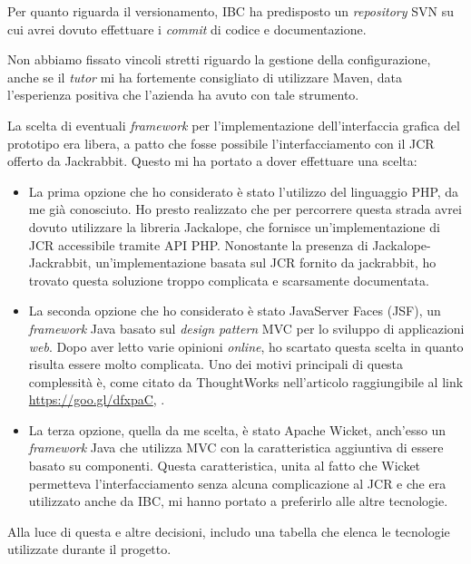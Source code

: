 		
		Per quanto riguarda il versionamento, IBC ha predisposto un \textit{repository} SVN su cui avrei dovuto effettuare i \textit{commit} di codice e documentazione.
		
		
		Non abbiamo fissato vincoli stretti riguardo la gestione della configurazione, anche se il \textit{tutor} mi ha fortemente consigliato di utilizzare Maven, data l'esperienza positiva che l'azienda ha avuto con tale strumento.
		
		
		La scelta di eventuali \textit{framework} per l'implementazione dell'interfaccia grafica del prototipo era libera, a patto che fosse possibile l'interfacciamento con il JCR offerto da Jackrabbit. Questo mi ha portato a dover effettuare una scelta:
		\begin{itemize}
			\item La prima opzione che ho considerato è stato l'utilizzo del linguaggio PHP, da me già conosciuto. Ho presto realizzato che per percorrere questa strada avrei dovuto utilizzare la libreria Jackalope, che fornisce un'implementazione di JCR accessibile tramite API PHP. Nonostante la presenza di Jackalope-Jackrabbit, un'implementazione basata sul JCR fornito da \gls{jackrabbit}, ho trovato questa soluzione troppo complicata e scarsamente documentata.
			\item La seconda opzione che ho considerato è stato JavaServer Faces (JSF), un \textit{framework} Java basato sul \textit{design pattern} MVC per lo sviluppo di applicazioni \textit{web}. Dopo aver letto varie opinioni \textit{online}, ho scartato questa scelta in quanto risulta essere molto complicata. Uno dei motivi principali di questa complessità è, come citato da ThoughtWorks nell'articolo raggiungibile al link \url{https://goo.gl/dfxpaC}, .
			\item La terza opzione, quella da me scelta, è stato Apache Wicket, anch'esso un \textit{framework} Java che utilizza MVC con la caratteristica aggiuntiva di essere basato su componenti. Questa caratteristica, unita al fatto che Wicket permetteva l'interfacciamento senza alcuna complicazione al JCR e che era utilizzato anche da IBC, mi hanno portato a preferirlo alle altre tecnologie.
		\end{itemize}
		Alla luce di questa e altre decisioni, includo una tabella che elenca le tecnologie utilizzate durante il progetto.
		
